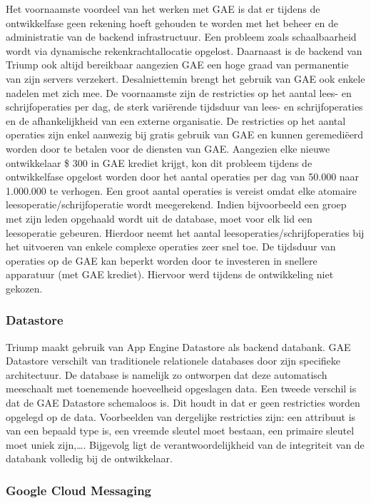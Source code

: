 Het voornaamste voordeel van het werken met GAE is dat er tijdens de ontwikkelfase geen rekening hoeft gehouden te worden met het  beheer en de administratie van de backend infrastructuur. Een probleem zoals schaalbaarheid wordt via dynamische rekenkrachtallocatie opgelost. Daarnaast is de backend van Triump ook altijd bereikbaar aangezien GAE een hoge graad van permanentie van zijn servers verzekert. Desalniettemin brengt het gebruik van GAE ook enkele nadelen met zich mee. De voornaamste zijn de restricties op het aantal lees- en schrijfoperaties per dag, de sterk variërende tijdsduur van lees- en schrijfoperaties en de afhankelijkheid van een externe organisatie. De restricties op het aantal operaties zijn enkel aanwezig bij gratis gebruik van GAE en kunnen geremediëerd worden door te betalen voor de diensten van GAE.
Aangezien elke nieuwe ontwikkelaar \$ 300 in GAE krediet krijgt, kon dit probleem tijdens de ontwikkelfase opgelost worden door het aantal operaties per dag van 50.000 naar 1.000.000 te verhogen. Een groot aantal operaties is vereist omdat elke atomaire  leesoperatie/schrijfoperatie wordt meegerekend. Indien bijvoorbeeld een groep met zijn leden opgehaald wordt uit de database, moet voor elk lid een leesoperatie gebeuren. Hierdoor neemt het aantal leesoperaties/schrijfoperaties bij het uitvoeren van enkele complexe operaties zeer snel toe. De tijdsduur van operaties op de GAE kan beperkt worden door te investeren in snellere apparatuur (met GAE krediet). Hiervoor werd tijdens de ontwikkeling niet gekozen.

\subsubsection{Datastore~\cite{Google_Datastore}}

Triump maakt gebruik van App Engine Datastore als backend databank. GAE Datastore verschilt van traditionele relationele databases door zijn specifieke architectuur. De database is namelijk zo ontworpen dat deze automatisch meeschaalt met toenemende hoeveelheid opgeslagen data. Een tweede verschil is dat de GAE Datastore schemaloos is. Dit houdt in dat er geen restricties worden opgelegd op de data. Voorbeelden van dergelijke restricties zijn: een attribuut is van een bepaald type is, een vreemde sleutel moet bestaan, een primaire sleutel moet uniek zijn,\ldots. Bijgevolg ligt de verantwoordelijkheid van de integriteit van de databank volledig bij de ontwikkelaar.

\subsubsection{Google Cloud Messaging~\cite{Google_Cloud_Messaging}}

